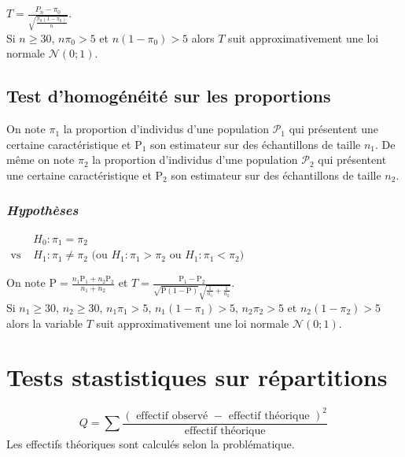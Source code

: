 \documentclass[12pt, a4paper]{article}
\begin{document}
 \hspace{3cm} $\displaystyle T=\frac{ P_n-\pi_0}{\sqrt{\frac{\pi_0(1-\pi_0)}{n}}}$. \\
Si $n\geq 30$, $n\pi_0>5$
et  $n(1-\pi_0)>5$ alors $T$ suit approximativement une loi normale $\mathcal{N}(0;1)$.

\subsection{Test d'homogénéité sur les proportions}

On note $\pi_1$ la proportion d'individus d'une population $\mathcal{P}_1$ qui présentent une certaine 
caractéristique et $\mathrm{P}_1$ son estimateur sur des échantillons de taille $n_1$.
De même on note $\pi_2$ la proportion d'individus d'une population $\mathcal{P}_2$ qui présentent une certaine caractéristique et $\mathrm{P}_2$ son estimateur sur des échantillons de taille $n_2$.


\subsubsection*{\it Hypothèses}
\begin{center}
$\begin{array}{ll}
 & H_0: \pi_1 = \pi_2 \\
\mbox{vs }& H_1: \pi_1 \neq \pi_2  \mbox{ (ou } H_1 : \pi_1 > \pi_2 \mbox{ ou } H_1 : \pi_1 < \pi_2 \mbox{)} 
\end{array}$
\end{center}

On note $\displaystyle \mathrm{P}=\frac{n_1 \mathrm{P}_1 + n_2 \mathrm{P}_2}{n_1+n_2}$
et $\displaystyle T=\frac{\mathrm{P}_1-\mathrm{P}_2}{\sqrt{\mathrm{P}(1-\mathrm{P})} \sqrt{\frac{1}{n_1} + \frac{1}{n_2}} }$. \\
Si $n_1\geq 30$, $n_2\geq 30$, $n_1 \pi_1>5$,  $n_1(1-\pi_1)>5$, $n_2 \pi_2>5$ et  $n_2(1-\pi_2)>5$
alors la variable $T$ suit approximativement une loi normale $\mathcal{N}(0;1)$.

\section{Tests stastistiques sur répartitions}

$$
Q=\sum\frac{ ({\mbox { effectif observé }} -  {\mbox { effectif théorique }})^2}
 { {\mbox { effectif théorique }}} \,
$$
Les effectifs théoriques sont calculés selon la problématique. 
\end{document}
